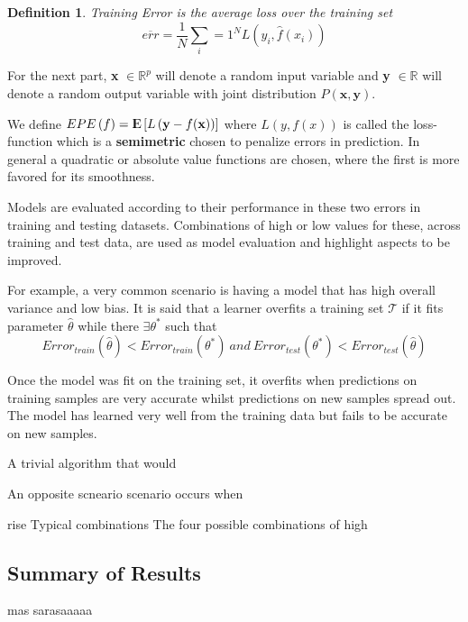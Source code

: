 \documentclass{article}%
\newcommand{\Expect}{{\rm I\kern-.3em E}}
\newtheorem{definition}{Definition}[subsection]
\theoremstyle{definition}
\begin{document}
 
 \begin{definition}{Training Error}
 	is the average loss over the training set
 	$$ \overline{err} = \frac{1}{N} \sum_i=1^N L(y_i, \hat{f}(x_i) )$$
 \end{definition}
 
 
 For the next part, \textbf{x} $\in \mathbb{R}^{p}$ will denote a random input variable and \textbf{y}  $\in \mathbb{R}$ will denote a random output variable with joint distribution $P\left(\textbf{x},\textbf{y}\right)$.
 
 We define $EPE\left(f \right) = \Expect\left[L\left(\textbf{y} - f(\textbf{x}) \right) \right] $ where $L(y,f\left(x\right))$ is called the loss-function which is a \textbf{semimetric} chosen to penalize errors in prediction. In general a quadratic or absolute value functions are chosen, where the first is more favored for its smoothness. 
 
 
 Models are evaluated according to their performance in these two errors in training and testing datasets. Combinations of high or low values for these, across training and test data, are used as model evaluation and highlight aspects to be improved. 
 
 For example, a very common scenario is having a model that has high overall variance and low bias. 
 It is said that a learner overfits a training set $\mathcal{T}$ if it fits parameter $\hat{\theta}$ while there $\exists \theta^*$ such that
 \begin{equation} \label{eq:overfitting}
 Error_{train}(\hat{\theta}) < Error_{train}(\theta^*) \  and \ Error_{test}(\theta^*) < Error_{test}(\hat{\theta})   
 \end{equation}
 
 Once the model was fit on the training set, it overfits when predictions on training samples are very accurate whilst predictions on new samples spread out. The model has learned very well from the training data but fails to be accurate on new samples.
 
 A trivial algorithm that would 
 
 An opposite scneario scenario occurs when
 
 
 rise Typical combinations
 The four possible combinations of high 
 



\subsection{Summary of Results}

mas sarasaaaaa
\end{document}

